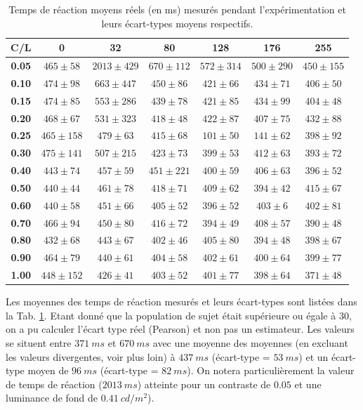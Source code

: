 	\begin{table}[h]	
		\centering
		\caption{Temps de réaction moyens réels (en ms) mesurés pendant l'expérimentation et leurs écart-types moyens respectifs.}
		\label{tab:real_reaction_times}
		\begin{tabular}{c|cccccc}
			\textbf{C/L} & \textbf{0} & \textbf{32} & \textbf{80} & \textbf{128} & \textbf{176} & \textbf{255}\\
			\hline
			\textbf{0.05} & $465 \pm 58$ & $2013 \pm 429$ & $670 \pm 112$ & $572 \pm 314$ & $500 \pm 290$ & $450 \pm 155$\\
			\textbf{0.10} & $474 \pm 98$ & $663 \pm 447$ & $450 \pm 86$ & $421 \pm 66$ & $434 \pm 71$ & $406 \pm 50$\\
			\textbf{0.15} & $474 \pm 85$ & $553 \pm 286$ & $439 \pm 78$ & $421 \pm 85$ & $434 \pm 99$ & $404 \pm 48$\\
			\textbf{0.20} & $468 \pm 67$ & $531 \pm 323$ & $418 \pm 48$ & $422 \pm 87$ & $407 \pm 75$ & $432 \pm 88$\\
			\textbf{0.25} & $465 \pm 158$ & $479 \pm 63$ & $415 \pm 68$ & $101 \pm 50$ & $141 \pm 62$ & $398 \pm 92$\\
			\textbf{0.30} & $475 \pm 141$ & $507 \pm 215$ & $423 \pm 73$ & $399 \pm 53$ & $412 \pm 63$ & $393 \pm 72$\\
			\textbf{0.40} & $443 \pm 74$ & $457 \pm 59$ & $451 \pm 221$ & $400 \pm 59$ & $406 \pm 63$ & $396 \pm 52$\\
			\textbf{0.50} & $440 \pm 44$ & $461 \pm 78$ & $418 \pm 71$ & $409 \pm 62$ & $394 \pm 42$ & $415 \pm 67$\\
			\textbf{0.60} & $440 \pm 58$ & $451 \pm 66$ & $405 \pm 52$ & $396 \pm 52$ & $403 \pm 6$ & $402 \pm 81$\\
			\textbf{0.70} & $466 \pm 94$ & $450 \pm 80$ & $416 \pm 72$ & $394 \pm 49$ & $408 \pm 57$ & $390 \pm 48$\\
			\textbf{0.80} & $432 \pm 68$ & $443 \pm 67$ & $402 \pm 46$ & $405 \pm 80$ & $394 \pm 48$ & $398 \pm 67$\\
			\textbf{0.90} & $464 \pm 79$ & $440 \pm 61$ & $404 \pm 58$ & $402 \pm 61$ & $400 \pm 64$ & $399 \pm 77$\\
			\textbf{1.00} & $448 \pm 152$ & $426 \pm 41$ & $403 \pm 52$ & $401 \pm 77$ & $398 \pm 64$ & $371 \pm 48$\\
		\end{tabular}
	\end{table}
	
	\par Les moyennes des temps de réaction mesurés et leurs écart-types sont listées dans la Tab. \ref{tab:real_reaction_times}. Etant donné que la population de sujet était supérieure ou égale à 30, on a pu calculer l'écart type réel (Pearson) et non pas un estimateur. Les valeurs se situent entre $371~ms$ et $670~ms$ avec une moyenne des moyennes (en excluant les valeurs divergentes, voir plus loin) à $437~ms$ (écart-type = $53~ms$) et un écart-type moyen de $96~ms$ (écart-type = $82~ms$). On notera particulièrement la valeur de temps de réaction ($2013~ms$) atteinte pour un contraste de $0.05$ et une luminance de fond de $0.41~cd/m^2$).
	
